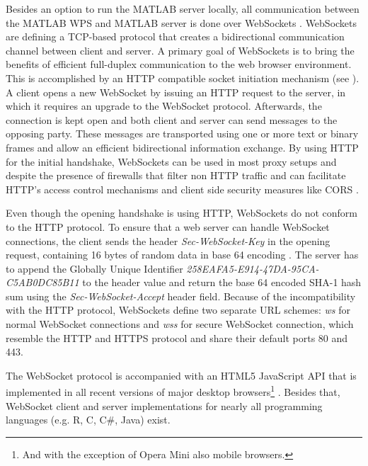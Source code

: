 		Besides an option to run the MATLAB server locally, all communication between the MATLAB WPS and MATLAB server is done over WebSockets \citep{ietf:rfc6455}. WebSockets are defining a TCP-based protocol that creates a bidirectional communication channel between client and server. A primary goal of WebSockets is to bring the benefits of efficient full-duplex communication to the web browser environment. This is accomplished by an HTTP compatible socket initiation mechanism (see ). A client opens a new WebSocket by issuing an HTTP request to the server, in which it requires an upgrade to the WebSocket protocol. Afterwards, the connection is kept open and both client and server can send messages to the opposing party. These messages are transported using one or more text or binary frames and allow an efficient bidirectional information exchange. By using HTTP for the initial handshake, WebSockets can be used in most proxy setups and despite the presence of firewalls that filter non HTTP traffic and can facilitate HTTP's access control mechanisms and client side security measures like \acl{CORS} \citep[\acs{CORS},][]{w3c:cors}.

		

		Even though the opening handshake is using HTTP, WebSockets do not conform to the HTTP protocol. To ensure that a web server can handle WebSocket connections, the client sends the header \emph{Sec-WebSocket-Key} in the opening request, containing 16 bytes of random data in base 64 encoding \citep{ietf:rfc4648}. The server has to append the Globally Unique Identifier \cite[GUID,][]{ietf:rfc4122} \emph{258EAFA5-E914-47DA-95CA-C5AB0DC85B11} to the header value and return the base 64 encoded SHA-1 \citep{NistFIPS1803} hash sum using the \emph{Sec-WebSocket-Accept} header field. Because of the incompatibility with the HTTP protocol, WebSockets define two separate URL schemes: \emph{ws} for normal WebSocket connections and \emph{wss} for secure WebSocket connection, which resemble the HTTP and HTTPS protocol and share their default ports 80 and 443.

		The WebSocket protocol is accompanied with an HTML5 JavaScript \ac{API} \citep{w3c:ws} that is implemented in all recent versions of major desktop browsers\footnote{And with the exception of Opera Mini also mobile browsers.} \citep{caniuse}. Besides that, WebSocket client and server implementations for nearly all programming languages (e.g. R, C, C\#, Java) exist.

